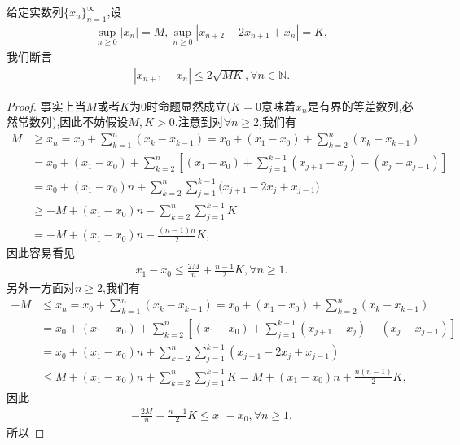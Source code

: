 \documentclass[../../main.tex]{subfiles}
\begin{document}
\begin{proposition}[数列内插]\label{proposition:数列内插}
给定实数列$\{x_n\}_{n=1}^\infty$,设
\begin{align*}
\sup_{n \geqslant 0} |x_n| = M, \sup_{n \geqslant 0} |x_{n+2} - 2x_{n+1} + x_n| = K,
\end{align*}
我们断言
\begin{align*}
|x_{n+1} - x_n| \leqslant 2\sqrt{MK}, \forall n \in \mathbb{N}.
\end{align*}
\end{proposition}
\begin{proof}
事实上当$M$或者$K$为0时命题显然成立($K=0$意味着$x_n$是有界的等差数列,必然常数列),因此不妨假设$M,K>0$.注意到对$\forall n \geqslant 2$,我们有
\begin{align*}
M&\geqslant x_n=x_0+\sum_{k=1}^n{\left( x_k-x_{k-1} \right)}=x_0+\left( x_1-x_0 \right) +\sum_{k=2}^n{\left( x_k-x_{k-1} \right)}
\\
&=x_0+\left( x_1-x_0 \right) +\sum_{k=2}^n{\left[ \left( x_1-x_0 \right) +\sum_{j=1}^{k-1}{\left( x_{j+1}-x_j \right) -\left( x_j-x_{j-1} \right)} \right]}
\\
&=x_0+(x_1-x_0)n+\sum_{k=2}^n{\sum_{j=1}^{k-1}{(x_{j+1}}}-2x_j+x_{j-1})
\\
&\geqslant -M+(x_1-x_0)n-\sum_{k=2}^n{\sum_{j=1}^{k-1}{K}}
\\
&=-M+(x_1-x_0)n-\frac{(n-1)n}{2}K,
\end{align*}
因此容易看见
\begin{align*}
x_1 - x_0 \leqslant \frac{2M}{n} + \frac{n-1}{2}K, \forall n \geqslant 1.
\end{align*}
另外一方面对$n \geqslant 2$,我们有
\begin{align*}
-M&\leqslant x_n=x_0+\sum_{k=1}^n{\left( x_k-x_{k-1} \right)}=x_0+\left( x_1-x_0 \right) +\sum_{k=2}^n{\left( x_k-x_{k-1} \right)}
\\
&=x_0+\left( x_1-x_0 \right) +\sum_{k=2}^n{\left[ \left( x_1-x_0 \right) +\sum_{j=1}^{k-1}{\left( x_{j+1}-x_j \right) -\left( x_j-x_{j-1} \right)} \right]}
\\
&=x_0+(x_1-x_0)n+\sum_{k=2}^n{\sum_{j=1}^{k-1}{(x_{j+1}-2x_j+x_{j-1})}}
\\
&\leqslant M+(x_1-x_0)n+\sum_{k=2}^n{\sum_{j=1}^{k-1}{K=M}}+(x_1-x_0)n+\frac{n(n-1)}{2}K,
\end{align*}
因此
\begin{align*}
-\frac{2M}{n} - \frac{n-1}{2}K \leqslant x_1 - x_0, \forall n \geqslant 1.
\end{align*}
所以

\end{proof}
\end{document}
